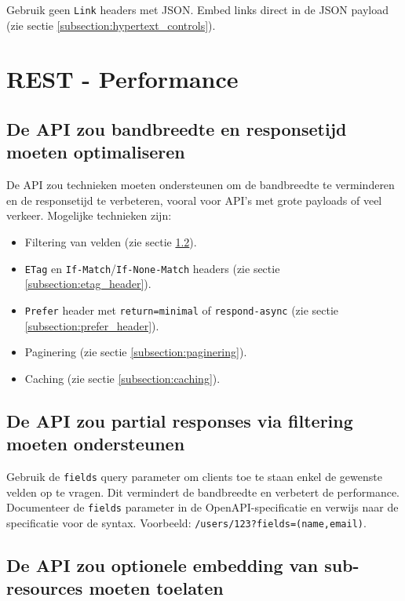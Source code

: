 Gebruik geen \texttt{Link} headers \autocite{rfc8288} met JSON. Embed links direct in de JSON payload (zie sectie \ref{subsection:hypertext_controls}).

\section{REST - Performance}

\subsection{De API zou bandbreedte en responsetijd moeten optimaliseren}
\label{subsection:bandbreedte_responsetijd}

De API zou technieken moeten ondersteunen om de bandbreedte te verminderen en de responsetijd te verbeteren, vooral voor API's met grote payloads of veel verkeer. Mogelijke technieken zijn:

\begin{itemize}
    \item Filtering van velden (zie sectie \ref{subsection:partial_responses}).
    \item \texttt{ETag} en \texttt{If-Match}/\texttt{If-None-Match} headers (zie sectie \ref{subsection:etag_header}).
    \item \texttt{Prefer} header met \texttt{return=minimal} of \texttt{respond-async} (zie sectie \ref{subsection:prefer_header}).
    \item Paginering (zie sectie \ref{subsection:paginering}).
    \item Caching (zie sectie \ref{subsection:caching}).
\end{itemize}

\subsection{De API zou partial responses via filtering moeten ondersteunen}
\label{subsection:partial_responses}

Gebruik de \texttt{fields} query parameter om clients toe te staan enkel de gewenste velden op te vragen. Dit vermindert de bandbreedte en verbetert de performance. Documenteer de \texttt{fields} parameter in de OpenAPI-specificatie en verwijs naar de specificatie voor de syntax. Voorbeeld: \texttt{/users/123?fields=(name,email)}.

\subsection{De API zou optionele embedding van sub-resources moeten toelaten}
\label{subsection:embedding_subresources}

